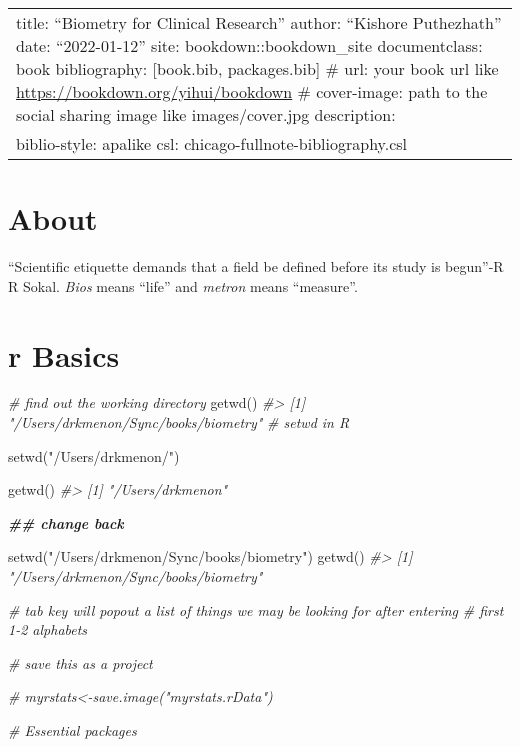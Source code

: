 \documentclass[
]{article}
\author{}
\date{\vspace{-2.5em}}
\newenvironment{Shaded}{\begin{snugshade}}{\end{snugshade}}
\newcommand{\CommentTok}[1]{\textcolor[rgb]{0.56,0.35,0.01}{\textit{#1}}}
\newcommand{\DocumentationTok}[1]{\textcolor[rgb]{0.56,0.35,0.01}{\textbf{\textit{#1}}}}
\newcommand{\FunctionTok}[1]{\textcolor[rgb]{0.00,0.00,0.00}{#1}}
\newcommand{\NormalTok}[1]{#1}
\newcommand{\StringTok}[1]{\textcolor[rgb]{0.31,0.60,0.02}{#1}}
\begin{document}
{
\setcounter{tocdepth}{2}
\tableofcontents
}
\begin{longtable}[]{@{}
  >{\raggedright\arraybackslash}p{}@{}}
\toprule
\endhead
title: ``Biometry for Clinical Research''
author: ``Kishore Puthezhath''
date: ``2022-01-12''
site: bookdown::bookdown\_site
documentclass: book
bibliography: {[}book.bib, packages.bib{]}
\# url: your book url like \url{https://bookdown.org/yihui/bookdown}
\# cover-image: path to the social sharing image like images/cover.jpg
description: \textbar{} \\
biblio-style: apalike
csl: chicago-fullnote-bibliography.csl \\
\bottomrule
\end{longtable}

\hypertarget{about}{%
\section{About}\label{about}}

``Scientific etiquette demands that a field be defined before its study is begun''-R R Sokal. \emph{Bios} means ``life'' and \emph{metron} means ``measure''.

\hypertarget{r-basics}{%
\section{r Basics}\label{r-basics}}

\begin{Shaded}
\begin{Highlighting}[]
\CommentTok{\# find out the working directory}
\FunctionTok{getwd}\NormalTok{()}
\CommentTok{\#\textgreater{} [1] "/Users/drkmenon/Sync/books/biometry"}
\CommentTok{\# setwd in R}

\FunctionTok{setwd}\NormalTok{(}\StringTok{"/Users/drkmenon/"}\NormalTok{)}

\FunctionTok{getwd}\NormalTok{()}
\CommentTok{\#\textgreater{} [1] "/Users/drkmenon"}

\DocumentationTok{\#\# change back}
\end{Highlighting}
\end{Shaded}

\begin{Shaded}
\begin{Highlighting}[]
\FunctionTok{setwd}\NormalTok{(}\StringTok{"/Users/drkmenon/Sync/books/biometry"}\NormalTok{)}
\FunctionTok{getwd}\NormalTok{()}
\CommentTok{\#\textgreater{} [1] "/Users/drkmenon/Sync/books/biometry"}

\CommentTok{\# tab key will popout a list of things we may be looking for after entering }
\CommentTok{\# first 1{-}2 alphabets}

\CommentTok{\# save this as a project}

\CommentTok{\# myrstats\textless{}{-}save.image("myrstats.rData")}

\CommentTok{\# Essential packages}
\end{Highlighting}
\end{Shaded}
\end{document}

